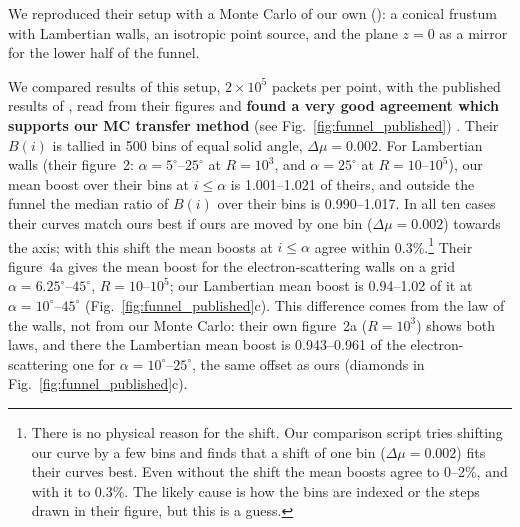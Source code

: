 We  reproduced their setup with a Monte Carlo of our own (): a conical frustum with Lambertian walls, an isotropic point source, and the plane $z = 0$ as a mirror for the lower half of the funnel.

We  compared results of this setup, $2\times10^5$ packets per point, with the published results of \citet{Ahlberg2026}, read from their figures and \textbf{found a very good agreement which supports our MC transfer method} (see Fig.~\ref{fig:funnel_published}) .
Their $B(i)$ is tallied in 500 bins of equal solid angle, $\Delta\mu = 0.002$.
For Lambertian walls (their figure~2: $\alpha = 5^\circ$--$25^\circ$ at $R = 10^3$, and $\alpha = 25^\circ$ at $R = 10$--$10^5$), our mean boost over their bins at $i \le \alpha$ is 1.001--1.021 of theirs, and outside the funnel the median ratio of $B(i)$ over their bins is 0.990--1.017.
In all ten cases their curves match ours best if ours are moved by one bin ($\Delta\mu = 0.002$) towards the axis; with this shift the mean boosts at $i \le \alpha$ agree within 0.3\%.\footnote{There is no physical reason for the shift. Our comparison script tries shifting our curve by a few bins and finds that a shift of one bin ($\Delta\mu = 0.002$) fits their curves best. Even without the shift the mean boosts agree to 0--2\%, and with it to 0.3\%. The likely cause is how the bins are indexed or the steps drawn in their figure, but this is a guess.}
Their figure~4a gives the mean boost for the electron-scattering walls on a grid $\alpha = 6.25^\circ$--$45^\circ$, $R = 10$--$10^5$; our Lambertian mean boost is 0.94--1.02 of it at $\alpha = 10^\circ$--$45^\circ$ (Fig.~\ref{fig:funnel_published}c).
This difference comes from the law of the walls, not from our Monte Carlo: their own figure~2a ($R = 10^3$) shows both laws, and there the Lambertian mean boost is 0.943--0.961 of the electron-scattering one for $\alpha = 10^\circ$--$25^\circ$, the same offset as ours (diamonds in Fig.~\ref{fig:funnel_published}c).


